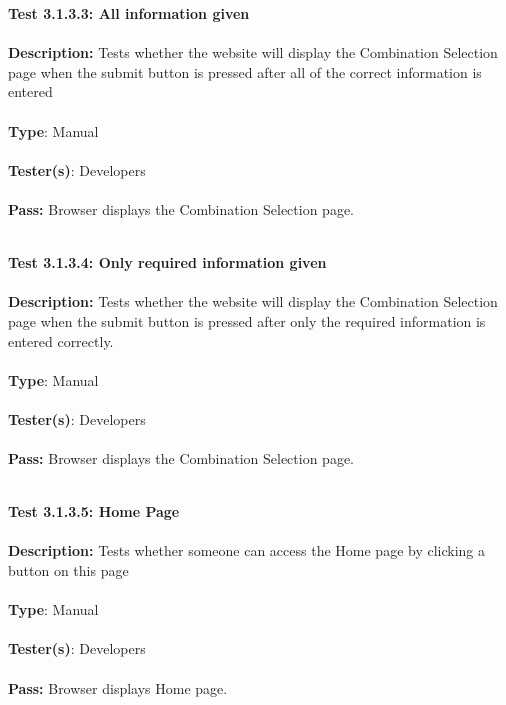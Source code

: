 \documentclass[12pt]{article}
\begin{document}
\begin{tcolorbox}
\textbf{Test 3.1.3.3: All information given} \\ \\
\textbf{Description:} Tests whether the website will display the Combination Selection page when the submit button is pressed after all of the correct information is entered\\ \\
\textbf{Type}:  Manual\\ \\
\textbf{Tester(s)}:  Developers\\ \\
\textbf{Pass:}  Browser displays the Combination Selection page. \\ \\
\end{tcolorbox}

\begin{tcolorbox}
\textbf{Test 3.1.3.4: Only required information given} \\ \\
\textbf{Description:} Tests whether the website will display the Combination Selection page when the submit button is pressed after only the required information is entered correctly.\\ \\
\textbf{Type}:  Manual\\ \\
\textbf{Tester(s)}:  Developers\\ \\
\textbf{Pass:} Browser displays the Combination Selection page. \\ \\
\end{tcolorbox}

\begin{tcolorbox}
\textbf{Test 3.1.3.5: Home Page} \\ \\
\textbf{Description:} Tests whether someone can access the Home page by clicking a button on this page\\ \\
\textbf{Type}:  Manual\\ \\
\textbf{Tester(s)}:  Developers\\ \\
\textbf{Pass:}  Browser displays Home page.\\ \\
\end{tcolorbox}
\end{document}

